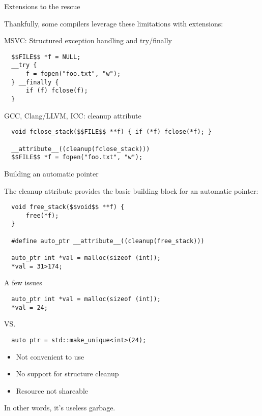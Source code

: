 \documentclass[10pt]{beamer}
\begin{document}
\begin{frame}[fragile]{Extensions to the rescue}

  Thankfully, some compilers leverage these limitations with extensions:

  \pause{}

  MSVC: Structured exception handling and try/finally

  \begin{lstlisting}
  $$FILE$$ *f = NULL;
  __try {
      f = fopen("foo.txt", "w");
  } __finally {
      if (f) fclose(f);
  }
  \end{lstlisting}

  \pause{}

  GCC, Clang/LLVM, ICC: cleanup attribute

  \begin{lstlisting}
  void fclose_stack($$FILE$$ **f) { if (*f) fclose(*f); }

  __attribute__((cleanup(fclose_stack)))
  $$FILE$$ *f = fopen("foo.txt", "w");
  \end{lstlisting}
\end{frame}

\begin{frame}[fragile]{Building an automatic pointer}

  The cleanup attribute provides the basic building block for an automatic pointer:

  \begin{lstlisting}
  void free_stack($$void$$ **f) {
      free(*f);
  }

  #define auto_ptr __attribute__((cleanup(free_stack)))

  auto_ptr int *val = malloc(sizeof (int));
  *val = 31>174;
  \end{lstlisting}

\end{frame}


\begin{frame}[fragile]{A few issues}

  \begin{lstlisting}
  auto_ptr int *val = malloc(sizeof (int));
  *val = 24;
  \end{lstlisting}

  VS.

  \begin{lstlisting}
  auto ptr = std::make_unique<int>(24);
  \end{lstlisting}

  \begin{itemize}
    \item Not convenient to use
    \item No support for structure cleanup
    \item Resource not shareable
  \end{itemize}

  In other words, it's useless garbage.

\end{frame}
\end{document}
